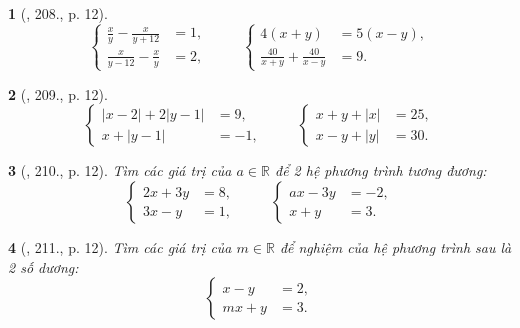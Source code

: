 \documentclass{article}
\newtheorem{baitoan}{}
\begin{document}
\begin{baitoan}[\cite{Binh_Toan_9_tap_2}, 208., p. 12]
	\begin{equation*}
		\left\{\begin{split}
			\frac{x}{y} - \frac{x}{y + 12} &= 1,\\
			\frac{x}{y - 12} - \frac{x}{y} &= 2,
		\end{split}\right.\hspace{1cm} \left\{\begin{split}
			4(x + y) &= 5(x - y),\\
			\frac{40}{x + y} + \frac{40}{x - y} &= 9.
		\end{split}\right. 
	\end{equation*}
\end{baitoan}

\begin{baitoan}[\cite{Binh_Toan_9_tap_2}, 209., p. 12]
	\begin{equation*}
		\left\{\begin{split}
			|x - 2| + 2|y - 1| &= 9,\\
			x + |y - 1| &= -1,
		\end{split}\right.\hspace{1cm} \left\{\begin{split}
			x + y + |x| &= 25,\\
			x - y + |y| &= 30.
		\end{split}\right. 
	\end{equation*}
\end{baitoan}

\begin{baitoan}[\cite{Binh_Toan_9_tap_2}, 210., p. 12]
	Tìm các giá trị của $a\in\mathbb{R}$ để 2 hệ phương trình tương đương:
	\begin{equation*}
		\left\{\begin{split}
			2x + 3y &= 8,\\
			3x - y &= 1,
		\end{split}\right.\hspace{1cm} \left\{\begin{split}
			ax - 3y &= -2,\\
			x + y &= 3.
		\end{split}\right. 
	\end{equation*}
\end{baitoan}

\begin{baitoan}[\cite{Binh_Toan_9_tap_2}, 211., p. 12]
	Tìm các giá trị của $m\in\mathbb{R}$ để nghiệm của hệ phương trình sau là 2 số dương:
	\begin{equation*}
		\left\{\begin{split}
			x - y &= 2,\\
			mx + y &= 3.
		\end{split}\right.
	\end{equation*}
\end{baitoan}
\end{document}
